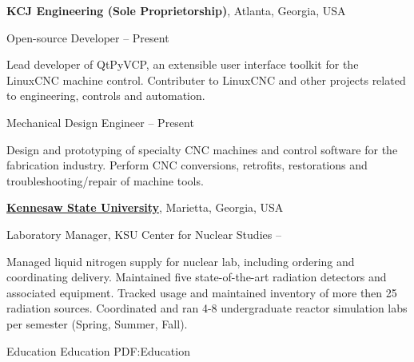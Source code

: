 \documentclass[
letterpaper,
MMMyyyy,
nonstopmode,
draftmode,
]{resume}
\begin{document}
\begin{Body}
\BigGap


\Entry
\textbf{KCJ Engineering (Sole Proprietorship)},
Atlanta, Georgia, USA

\Gap
\BulletItem
Open-source Developer
\hfill
{} --
Present
\begin{Detail}
\SubBulletItem
Lead developer of QtPyVCP, an extensible user interface toolkit for the LinuxCNC machine control.
\SubBulletItem
Contributer to LinuxCNC and other projects related to engineering, controls and automation.
\end{Detail}

\Gap
\BulletItem
Mechanical Design Engineer
\hfill
{} --
Present
\begin{Detail}
\SubBulletItem
Design and prototyping of specialty CNC machines and control software for the fabrication industry.
\SubBulletItem
Perform CNC conversions, retrofits, restorations and troubleshooting/repair of machine tools.
\end{Detail}

\BigGap

\Entry
\href{http://kennesaw.edu/}
{\textbf{Kennesaw State University}},
Marietta, Georgia, USA

\Gap
\BulletItem
Laboratory Manager,
KSU Center for Nuclear Studies
\hfill
{} --
\begin{Detail}
\SubBulletItem
Managed liquid nitrogen supply for nuclear lab, including ordering and coordinating delivery.
\SubBulletItem
Maintained five state-of-the-art radiation detectors and associated equipment.
\SubBulletItem
Tracked usage and maintained inventory of more then 25 radiation sources.
\SubBulletItem
Coordinated and ran 4-8 undergraduate reactor simulation labs per semester (Spring, Summer, Fall).
\end{Detail}


%



\Section
{Education}
{Education}
{PDF:Education}


\end{Body}
\end{document}

